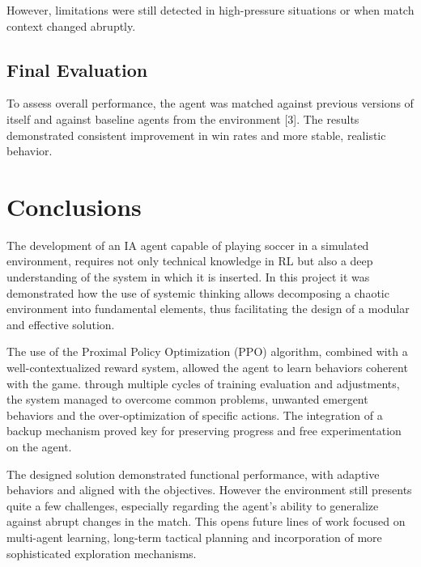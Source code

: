 \documentclass[conference]{IEEEtran}
\begin{document}
However, limitations were still detected in high-pressure situations or when match context changed abruptly.

\subsection{Final Evaluation}
To assess overall performance, the agent was matched against previous versions of itself and against baseline agents from the environment [3]. The results demonstrated consistent improvement in win rates and more stable, realistic behavior.

\section{Conclusions}
The development of an IA agent capable of playing soccer in a simulated environment, requires not only technical knowledge in RL but also a deep understanding of the system in which it is inserted. In this project it was demonstrated how the use of systemic thinking allows decomposing a chaotic environment into fundamental elements, thus facilitating the design of a modular and effective solution.

The use of the Proximal Policy Optimization (PPO) algorithm, combined with a well-contextualized reward system, allowed the agent to learn behaviors coherent with the game. through multiple cycles of training evaluation and adjustments, the system managed to overcome common problems, unwanted emergent behaviors and the over-optimization of specific actions. The integration of a backup mechanism proved key for preserving progress and free experimentation on the agent.

The designed solution demonstrated functional performance, with adaptive behaviors and aligned with the objectives. However the environment still presents quite a few challenges, especially regarding the agent's ability to generalize against abrupt changes in the match. This opens future lines of work focused on multi-agent learning, long-term tactical planning and incorporation of more sophisticated exploration mechanisms.
\end{document}
